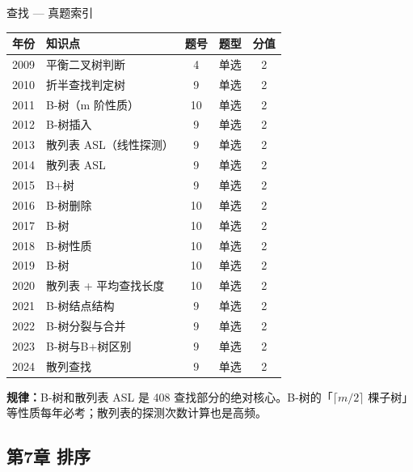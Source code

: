 \begin{tablebox}{查找 — 真题索引}
\centering
\begin{tabular}{|c|l|c|c|c|}
\hline
年份 & 知识点 & 题号 & 题型 & 分值 \\
\hline
2009 & 平衡二叉树判断 & 4 & 单选 & 2 \\
2010 & 折半查找判定树 & 9 & 单选 & 2 \\
2011 & B-树（m 阶性质）& 10 & 单选 & 2 \\
2012 & B-树插入 & 9 & 单选 & 2 \\
2013 & 散列表 ASL（线性探测）& 9 & 单选 & 2 \\
2014 & 散列表 ASL & 9 & 单选 & 2 \\
2015 & B+树 & 9 & 单选 & 2 \\
2016 & B-树删除 & 10 & 单选 & 2 \\
2017 & B-树 & 10 & 单选 & 2 \\
2018 & B-树性质 & 10 & 单选 & 2 \\
2019 & B-树 & 10 & 单选 & 2 \\
2020 & 散列表 + 平均查找长度 & 10 & 单选 & 2 \\
2021 & B-树结点结构 & 9 & 单选 & 2 \\
2022 & B-树分裂与合并 & 9 & 单选 & 2 \\
2023 & B-树与B+树区别 & 9 & 单选 & 2 \\
2024 & 散列查找 & 9 & 单选 & 2 \\
\hline
\end{tabular}
\end{tablebox}

\noindent\textbf{规律：}B-树和散列表 ASL 是 408 查找部分的绝对核心。B-树的「$\lceil m/2\rceil$ 棵子树」等性质每年必考；散列表的探测次数计算也是高频。

\subsection*{第7章 排序}

